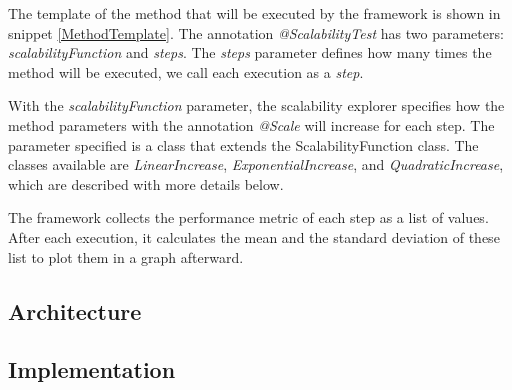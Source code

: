 The template of the method that will be executed by the framework is shown in snippet \ref{MethodTemplate}. The annotation \emph{@ScalabilityTest} has two parameters: \emph{scalabilityFunction} and \emph{steps}. The \emph{steps} parameter defines how many times the method will be executed, we call each execution as a \emph{step}.

With the \emph{scalabilityFunction} parameter, the scalability explorer specifies how the method parameters with the annotation \emph{@Scale} will increase for each step. The parameter specified is a class that extends the ScalabilityFunction class. The classes available are \emph{LinearIncrease}, \emph{ExponentialIncrease}, and \emph{QuadraticIncrease}, which are described with more details below.

The framework collects the performance metric of each step as a list of values. After each execution, it calculates the mean and the standard deviation of these list to plot them in a graph afterward.




\subsection{Architecture}

\subsection{Implementation}